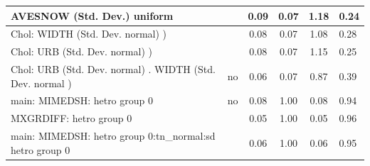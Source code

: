 \begin{table}
\begin{center}
\begin{tabular}{|l|l|c|c|c|l|}
			\hline
			AVESNOW (Std. Dev.) uniform &  & 0.09 & 0.07 & 1.18 & 0.24 \\
			\hline
			 Chol: WIDTH (Std. Dev. normal) ) &  & 0.08 & 0.07 & 1.08 & 0.28 \\
			\hline
			 Chol: URB (Std. Dev. normal) ) &  & 0.08 & 0.07 & 1.15 & 0.25 \\
			\hline
			 Chol: URB (Std. Dev. normal) . WIDTH (Std. Dev.   normal ) & no & 0.06 & 0.07 & 0.87 & 0.39 \\
			\hline
			main: MIMEDSH: hetro group 0 & no & 0.08 & 1.00 & 0.08 & 0.94 \\
			\hline
			MXGRDIFF: hetro group 0 &  & 0.05 & 1.00 & 0.05 & 0.96 \\
			\hline
			main: MIMEDSH: hetro group 0:tn_normal:sd  hetro group 0 &  & 0.06 & 1.00 & 0.06 & 0.95 \\
			\hline
		\end{tabular}
	\end{center}
\end{table}